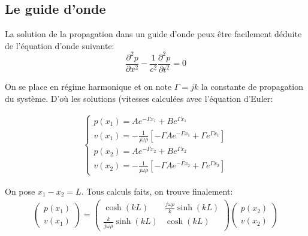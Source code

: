 \subsection{Le guide d'onde}
La solution de la propagation dans un guide d'onde peux être facilement déduite de l'équation d'onde suivante:
\begin{equation}
\frac{\partial ^2 p}{\partial x^2} -\frac{1}{c^{2}} \frac{\partial ^2 p}{\partial t^2}= 0
\end{equation}

On se place en régime harmonique et on note $\Gamma = jk$ la constante de propagation du système. D’où les solutions (vitesses calculées avec l'équation d'Euler:

\begin{eqnarray*}
\begin{cases}
p(x_1)  =  A e^{-\Gamma x_1} + B e^{\Gamma x_1} \\
v(x_1)  =  -\frac{1}{j\omega\rho} [ -\Gamma A e^{-\Gamma x_1} + \Gamma e^{\Gamma x_1}]\\
p(x_2)  =  A e^{-\Gamma x_2} + B e^{\Gamma x_2} \\
v(x_2)  =  -\frac{1}{j\omega\rho} [ -\Gamma A e^{-\Gamma x_2} + \Gamma e^{\Gamma x_2}]
\end{cases}
\end{eqnarray*}
 
On pose $x_1 - x_2 = L$. Tous calculs faits, on trouve finalement:
\begin{eqnarray*}
\begin{pmatrix} p(x_1) \\ v(x_1) \end{pmatrix} = \begin{pmatrix} \cosh(kL) & \frac{j\omega\rho}{k} \sinh(k L) \\  \frac{k}{j\omega\rho}\sinh(k L) & \cosh(k L) \end{pmatrix} \begin{pmatrix} p(x_2) \\ v(x_2) \end{pmatrix}
\end{eqnarray*}



